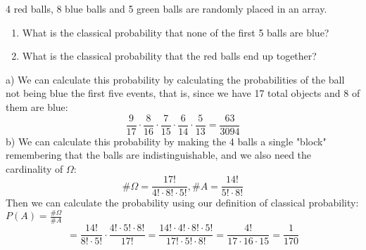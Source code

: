 \documentclass{article}
\begin{document}
        \begin{solutions}
            4 red balls, 8 blue balls and 5 green balls are randomly placed in an array.
            \begin{enumerate}[label=\alph*)]
                \item What is the classical probability that none of the first 5 balls are blue?
                \item What is the classical probability that the red balls end up together?
            \end{enumerate}
            \medskip
            \noindent a) We can calculate this probability by calculating the probabilities of the ball not being blue the first five events, that is, since we have 17 total objects and 8 of them are blue:
            \[ 
                \frac{9}{17} \cdot \frac{8}{16} \cdot \frac{7}{15} \cdot \frac{6}{14} \cdot \frac{5}{13} = \frac{63}{3094}
            \]
            \noindent b) We can calculate this probability by making the 4 balls a single "block" remembering that the balls are indistinguishable, and we also need the cardinality of $\Omega$:
            \[ 
                \#\Omega = \frac{17!}{4! \cdot 8! \cdot 5!}, \# A = \frac{14!}{5! \cdot 8!} 
            \]
            Then we can calculate the probability using our definition of classical probability: $P(A) = \frac{\#\Omega}{\# A}$
            \[ 
                = \frac{14!}{8! \cdot 5!} \cdot \frac{4! \cdot 5! \cdot 8!}{17!} = \frac{14! \cdot 4! \cdot 8! \cdot 5!}{17! \cdot 5! \cdot 8!} = \frac{4!}{17 \cdot 16 \cdot 15} = \frac{1}{170}
            \]
        \end{solutions}
\end{document}
